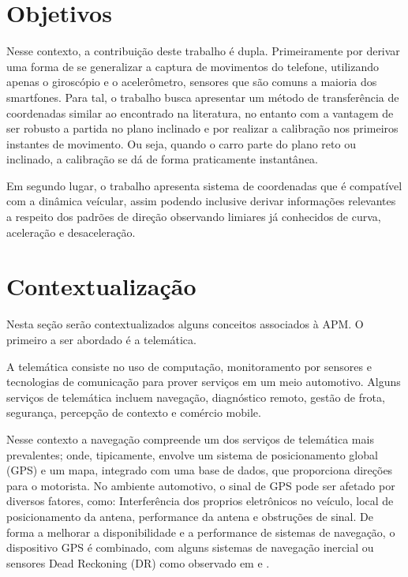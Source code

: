 \section{Objetivos}

Nesse contexto, a contribuição deste trabalho é dupla. Primeiramente por derivar uma forma de se generalizar a captura de movimentos do telefone, utilizando apenas o giroscópio e o acelerômetro, sensores que são comuns a maioria dos smartfones. Para tal, o trabalho busca apresentar um método de transferência de coordenadas similar ao encontrado na literatura, no entanto com a vantagem de ser robusto a partida no plano inclinado e por realizar a calibração nos primeiros instantes de movimento. Ou seja, quando o carro parte do plano reto ou inclinado, a calibração se dá de forma praticamente instantânea.

Em segundo lugar, o trabalho apresenta sistema de coordenadas que é compatível com a dinâmica veícular, assim podendo inclusive derivar informações relevantes a respeito dos padrões de direção observando limiares já conhecidos de curva, aceleração e desaceleração.

\section{Contextualização}

Nesta seção serão contextualizados alguns conceitos associados à APM. O primeiro a ser abordado é a telemática. 

A telemática consiste no uso de computação, monitoramento por sensores e tecnologias de comunicação para prover serviços em um meio automotivo. Alguns serviços de telemática incluem navegação, diagnóstico remoto, gestão de frota, segurança, percepção de contexto e comércio mobile.

Nesse contexto a navegação compreende um dos serviços de telemática mais prevalentes; onde, tipicamente, envolve um sistema de posicionamento global (GPS) e um mapa, integrado com uma base de dados, que proporciona direções para o motorista. No ambiente automotivo, o sinal de GPS pode ser afetado por diversos fatores, como: Interferência dos proprios eletrônicos no veículo, local de posicionamento da antena, performance da antena e obstruções de sinal. De forma a melhorar a disponibilidade e a performance de sistemas de navegação, o dispositivo GPS é combinado, com alguns sistemas de navegação inercial ou sensores Dead Reckoning (DR) como observado em \cite{ochieng2003integration} e \cite{cho2006robust}.

